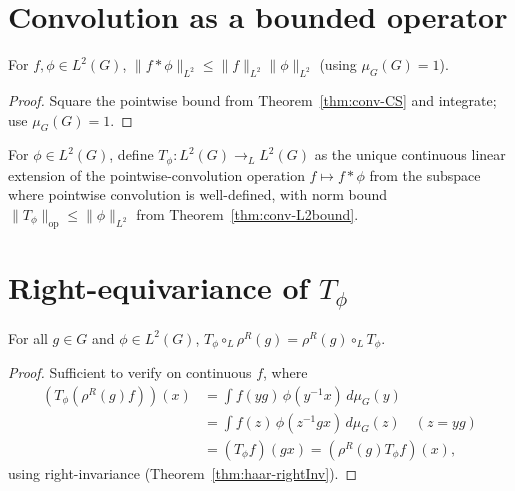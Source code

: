 \section{Convolution as a bounded operator}

\begin{theorem}
  \label{thm:conv-L2bound}
  For $f, \phi \in L^2(G)$, $\|f*\phi\|_{L^2} \leq \|f\|_{L^2}\|\phi\|_{L^2}$
  (using $\mu_G(G) = 1$).
\end{theorem}

\begin{proof}
  Square the pointwise bound from Theorem~\ref{thm:conv-CS} and
  integrate; use $\mu_G(G) = 1$.
\end{proof}

\begin{definition}
  \label{def:Tphi}
  For $\phi \in L^2(G)$, define
  $T_\phi : L^2(G) \to_L L^2(G)$ as the unique continuous linear extension
  of the pointwise-convolution operation $f \mapsto f*\phi$ from
  the subspace where pointwise convolution is well-defined, with norm
  bound $\|T_\phi\|_{\mathrm{op}} \leq \|\phi\|_{L^2}$ from
  Theorem~\ref{thm:conv-L2bound}.
\end{definition}

\section{Right-equivariance of \texorpdfstring{$T_{\phi}$}{T\_phi}}

\begin{theorem}
  \label{thm:Tphi-comm-rightReg}
  For all $g \in G$ and $\phi \in L^2(G)$,
  $T_\phi \circ_L \rho^R(g) = \rho^R(g) \circ_L T_\phi$.
\end{theorem}

\begin{proof}
  Sufficient to verify on continuous $f$, where
  \begin{align*}
    (T_\phi(\rho^R(g) f))(x) &= \int f(y g)\,\phi(y^{-1} x)\,d\mu_G(y)\\
      &= \int f(z)\,\phi(z^{-1} g x)\,d\mu_G(z) \quad (z = yg) \\
      &= (T_\phi f)(gx) = (\rho^R(g) T_\phi f)(x),
  \end{align*}
  using right-invariance (Theorem~\ref{thm:haar-rightInv}).
\end{proof}

